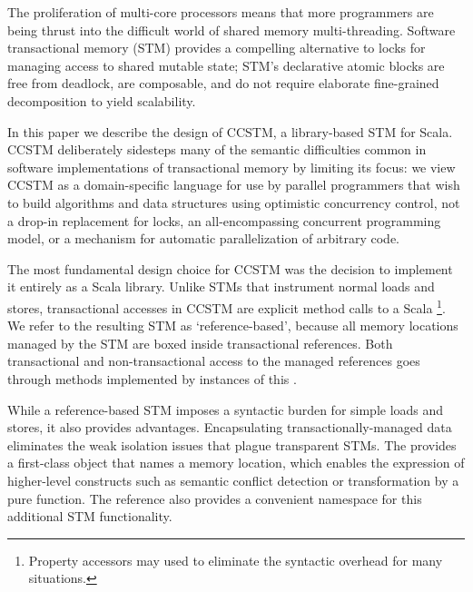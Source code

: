 The proliferation of multi-core processors means that more programmers are
being thrust into the difficult world of shared memory multi-threading.
Software transactional memory (STM) provides a compelling alternative to
locks for managing access to shared mutable state; STM's declarative
atomic blocks are free from deadlock, are composable, and do not
require elaborate fine-grained decomposition to yield scalability.


In this paper we describe the design of CCSTM, a library-based STM
for Scala.  CCSTM deliberately sidesteps many of the 
semantic difficulties common in software implementations of transactional
memory by limiting its focus: we view CCSTM as a domain-specific language
for use by parallel programmers that wish to build algorithms and data
structures using optimistic concurrency control, not a drop-in replacement for
locks, an all-encompassing concurrent programming model, or a mechanism
for automatic parallelization of arbitrary code.

The most fundamental design choice for CCSTM was the decision to
implement it entirely as a Scala library.  Unlike STMs that instrument
normal loads and stores, transactional accesses in CCSTM are explicit
method calls to a Scala \footnote{Property accessors
may used to eliminate the syntactic overhead for many situations.  }.
We refer to the resulting STM as `reference-based', because all memory
locations managed by the STM are boxed inside transactional references.
Both transactional and non-transactional access to the managed references
goes through methods implemented by instances of this .

While a reference-based STM imposes a syntactic burden for simple loads and
stores, it also provides advantages.  Encapsulating transactionally-managed
data eliminates the weak isolation issues that plague transparent STMs.
The  provides
a first-class object that names a memory location, which enables the
expression of higher-level constructs such as semantic conflict detection
or transformation by a pure function.  The reference also provides a convenient
namespace for this additional STM functionality.


